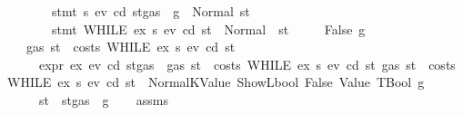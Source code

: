 \begin{isabellebody}
\ \ \ \ \ \ \ {\isachardoublequoteopen}stmt\ s{}\ ev\ cd\ {\isacharparenleft}{\kern0pt}st{\isasymlparr}gas\ {\isacharcolon}{\kern0pt}{\isacharequal}{\kern0pt}\ g{\isasymrparr}{\isacharparenright}{\kern0pt}\ {\isacharequal}{\kern0pt}\ Normal{\isacharparenleft}{\kern0pt}{\isacharparenleft}{\kern0pt}{\isacharparenright}{\kern0pt}{\isacharcomma}{\kern0pt}\ st{\isacharprime}{\kern0pt}{\isacharprime}{\kern0pt}{\isacharparenright}{\kern0pt}{\isachardoublequoteclose}\isanewline
\ \ \ \ \ \ \ {\isachardoublequoteopen}stmt\ {\isacharparenleft}{\kern0pt}WHILE\ ex\ s{}{\isacharparenright}{\kern0pt}\ ev\ cd\ st{\isacharprime}{\kern0pt}{\isacharprime}{\kern0pt}\ {\isacharequal}{\kern0pt}\ Normal\ {\isacharparenleft}{\kern0pt}{\isacharparenleft}{\kern0pt}{\isacharparenright}{\kern0pt}{\isacharcomma}{\kern0pt}\ st{\isacharprime}{\kern0pt}{\isacharparenright}{\kern0pt}{\isachardoublequoteclose}\isanewline
\ \ \ \ {\isacharbar}{\kern0pt}\ {\isacharparenleft}{\kern0pt}False{\isacharparenright}{\kern0pt}\ g\isanewline
\ \ \ {\isachardoublequoteopen}gas\ st\ {\isachargreater}{\kern0pt}\ costs\ {\isacharparenleft}{\kern0pt}WHILE\ ex\ s{}{\isacharparenright}{\kern0pt}\ ev\ cd\ st{\isachardoublequoteclose}\isanewline
\ \ \ \ \ {\isachardoublequoteopen}expr\ ex\ ev\ cd\ {\isacharparenleft}{\kern0pt}st{\isasymlparr}gas\ {\isacharcolon}{\kern0pt}{\isacharequal}{\kern0pt}\ gas\ st\ {\isacharminus}{\kern0pt}\ costs\ {\isacharparenleft}{\kern0pt}WHILE\ ex\ s{}{\isacharparenright}{\kern0pt}\ ev\ cd\ st{\isasymrparr}{\isacharparenright}{\kern0pt}\ {\isacharparenleft}{\kern0pt}gas\ st\ {\isacharminus}{\kern0pt}\ costs\ {\isacharparenleft}{\kern0pt}WHILE\ ex\ s{}{\isacharparenright}{\kern0pt}\ ev\ cd\ st{\isacharparenright}{\kern0pt}\ {\isacharequal}{\kern0pt}\ Normal{\isacharparenleft}{\kern0pt}{\isacharparenleft}{\kern0pt}KValue\ {\isacharparenleft}{\kern0pt}ShowL\isactrlsub b\isactrlsub o\isactrlsub o\isactrlsub l\ False{\isacharparenright}{\kern0pt}{\isacharcomma}{\kern0pt}\ Value\ TBool{\isacharparenright}{\kern0pt}{\isacharcomma}{\kern0pt}\ g{\isacharparenright}{\kern0pt}{\isachardoublequoteclose}\isanewline
\ \ \ \ \ {\isachardoublequoteopen}st{\isacharprime}{\kern0pt}\ {\isacharequal}{\kern0pt}\ st{\isasymlparr}gas\ {\isacharcolon}{\kern0pt}{\isacharequal}{\kern0pt}\ g{\isasymrparr}{\isachardoublequoteclose}\isanewline
%
\isadelimproof
\ \ %
\endisadelimproof
%
\isatagproof
{}\isamarkupfalse%
\ assms\isanewline
{}\isamarkupfalse%

\end{isabellebody}
